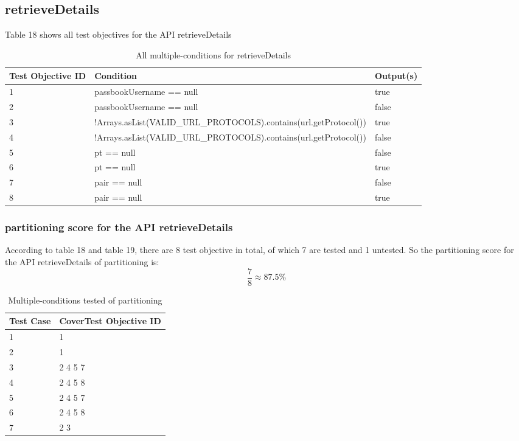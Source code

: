 \documentclass{article}
\begin{document}
\subsection{retrieveDetails}
Table 18 shows all test objectives for the API retrieveDetails
\begin{longtable}{|p{2cm}|p{11cm}|p{2cm}|}
\caption{All multiple-conditions for retrieveDetails}\\
\hline 
Test Objective ID&Condition&Output(s)\\
\hline  
1&passbookUsername == null&true\\
\hline
2&passbookUsername == null&false\\
\hline
3&!Arrays.asList(VALID\_URL\_PROTOCOLS).contains(url.getProtocol())&true\\
\hline
4&!Arrays.asList(VALID\_URL\_PROTOCOLS).contains(url.getProtocol())&false\\
\hline
5&pt == null&false\\
\hline
6&pt == null&true\\
\hline
7&pair == null&false\\
\hline
8&pair == null&true\\
\hline
\end{longtable}

\subsubsection{partitioning score for the API retrieveDetails}
According to table 18 and table 19, there are 8 test objective in total, of which 7 are tested and 1 untested. So the partitioning score for the API retrieveDetails of partitioning is:
$$\frac{7}{8}\approx87.5\%$$
\begin{longtable}{|p{2cm}|p{8cm}|}
\caption{Multiple-conditions tested of partitioning}\\
\hline 
Test Case& CoverTest Objective ID\\
\hline  
1&1\\
\hline
2&1\\
\hline
3&2 4 5 7\\
\hline
4&2 4 5 8\\
\hline
5&2 4 5 7\\
\hline
6&2 4 5 8\\
\hline
7&2 3\\
\hline
\end{longtable}

\end{document}
